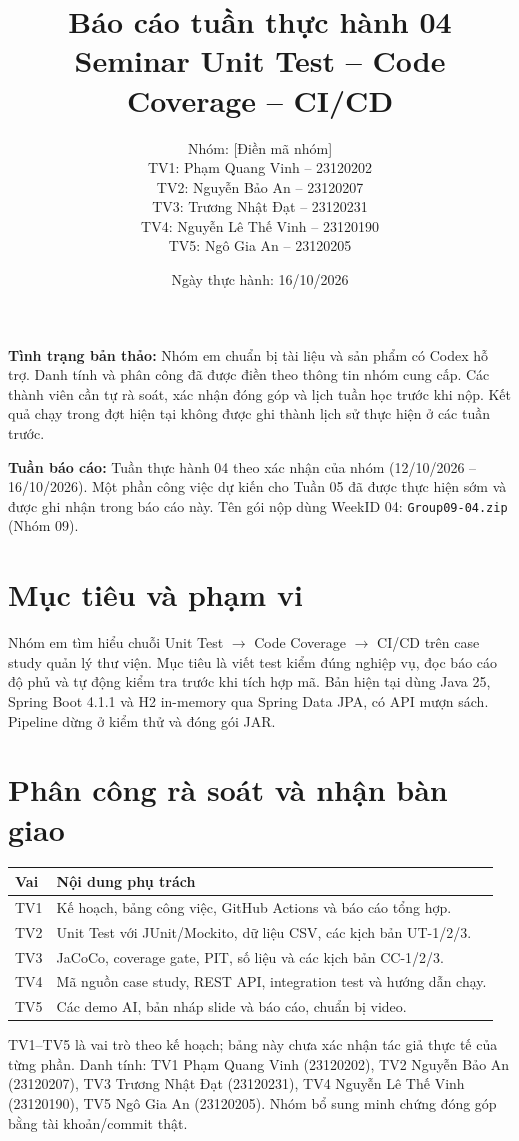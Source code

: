 \documentclass[12pt,a4paper]{article}
\title{Báo cáo tuần thực hành 04\\Seminar Unit Test -- Code Coverage -- CI/CD}
\author{Nhóm: [Điền mã nhóm]\\[6pt]
TV1: Phạm Quang Vinh -- 23120202\\TV2: Nguyễn Bảo An -- 23120207\\TV3: Trương Nhật Đạt -- 23120231\\TV4: Nguyễn Lê Thế Vinh -- 23120190\\TV5: Ngô Gia An -- 23120205}
\date{Ngày thực hành: 16/10/2026}
\begin{document}
\maketitle

\textbf{Tình trạng bản thảo:} Nhóm em chuẩn bị tài liệu và sản phẩm có Codex hỗ trợ. Danh tính và phân công đã được điền theo thông tin nhóm cung cấp. Các thành viên cần tự rà soát, xác nhận đóng góp và lịch tuần học trước khi nộp. Kết quả chạy trong đợt hiện tại không được ghi thành lịch sử thực hiện ở các tuần trước.

\textbf{Tuần báo cáo:} Tuần thực hành 04 theo xác nhận của nhóm (12/10/2026 -- 16/10/2026). Một phần công việc dự kiến cho Tuần 05 đã được thực hiện sớm và được ghi nhận trong báo cáo này. Tên gói nộp dùng WeekID 04: \texttt{Group09-04.zip} (Nhóm 09).

\tableofcontents
\newpage

\section{Mục tiêu và phạm vi}
Nhóm em tìm hiểu chuỗi Unit Test $\rightarrow$ Code Coverage $\rightarrow$ CI/CD trên case study quản lý thư viện. Mục tiêu là viết test kiểm đúng nghiệp vụ, đọc báo cáo độ phủ và tự động kiểm tra trước khi tích hợp mã. Bản hiện tại dùng Java 25, Spring Boot 4.1.1 và H2 in-memory qua Spring Data JPA, có API mượn sách. Pipeline dừng ở kiểm thử và đóng gói JAR.

\section{Phân công rà soát và nhận bàn giao}
\begin{longtable}{p{1cm}p{12.5cm}}
\toprule
Vai & Nội dung phụ trách \\
\midrule
TV1 & Kế hoạch, bảng công việc, GitHub Actions và báo cáo tổng hợp. \\
TV2 & Unit Test với JUnit/Mockito, dữ liệu CSV, các kịch bản UT-1/2/3. \\
TV3 & JaCoCo, coverage gate, PIT, số liệu và các kịch bản CC-1/2/3. \\
TV4 & Mã nguồn case study, REST API, integration test và hướng dẫn chạy. \\
TV5 & Các demo AI, bản nháp slide và báo cáo, chuẩn bị video. \\
\bottomrule
\end{longtable}
TV1--TV5 là vai trò theo kế hoạch; bảng này chưa xác nhận tác giả thực tế của từng phần. Danh tính: TV1 Phạm Quang Vinh (23120202), TV2 Nguyễn Bảo An (23120207), TV3 Trương Nhật Đạt (23120231), TV4 Nguyễn Lê Thế Vinh (23120190), TV5 Ngô Gia An (23120205). Nhóm bổ sung minh chứng đóng góp bằng tài khoản/commit thật.
\end{document}
